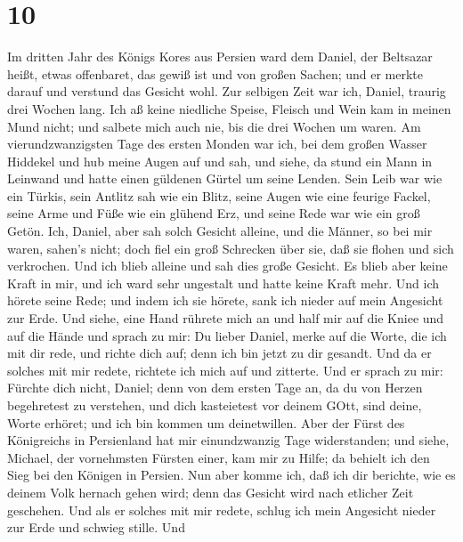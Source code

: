 \hypertarget{section-9}{%
\section{10}\label{section-9}}

 Im dritten Jahr des Königs Kores aus Persien ward dem
Daniel, der Beltsazar heißt, etwas offenbaret, das gewiß ist und von
großen Sachen; und er merkte darauf und verstund das Gesicht wohl.
 Zur selbigen Zeit war ich, Daniel, traurig drei Wochen
lang.  Ich aß keine niedliche Speise, Fleisch und Wein kam
in meinen Mund nicht; und salbete mich auch nie, bis die drei Wochen um
waren.  Am vierundzwanzigsten Tage des ersten Monden war
ich, bei dem großen Wasser Hiddekel  und hub meine Augen auf
und sah, und siehe, da stund ein Mann in Leinwand und hatte einen
güldenen Gürtel um seine Lenden.  Sein Leib war wie ein
Türkis, sein Antlitz sah wie ein Blitz, seine Augen wie eine feurige
Fackel, seine Arme und Füße wie ein glühend Erz, und seine Rede war wie
ein groß Getön.  Ich, Daniel, aber sah solch Gesicht
alleine, und die Männer, so bei mir waren, sahen's nicht; doch fiel ein
groß Schrecken über sie, daß sie flohen und sich verkrochen.
 Und ich blieb alleine und sah dies große Gesicht. Es blieb
aber keine Kraft in mir, und ich ward sehr ungestalt und hatte keine
Kraft mehr.  Und ich hörete seine Rede; und indem ich sie
hörete, sank ich nieder auf mein Angesicht zur Erde.  Und
siehe, eine Hand rührete mich an und half mir auf die Kniee und auf die
Hände  und sprach zu mir: Du lieber Daniel, merke auf die
Worte, die ich mit dir rede, und richte dich auf; denn ich bin jetzt zu
dir gesandt. Und da er solches mit mir redete, richtete ich mich auf und
zitterte.  Und er sprach zu mir: Fürchte dich nicht,
Daniel; denn von dem ersten Tage an, da du von Herzen begehretest zu
verstehen, und dich kasteietest vor deinem GOtt, sind deine, Worte
erhöret; und ich bin kommen um deinetwillen.  Aber der
Fürst des Königreichs in Persienland hat mir einundzwanzig Tage
widerstanden; und siehe, Michael, der vornehmsten Fürsten einer, kam mir
zu Hilfe; da behielt ich den Sieg bei den Königen in Persien.
 Nun aber komme ich, daß ich dir berichte, wie es deinem
Volk hernach gehen wird; denn das Gesicht wird nach etlicher Zeit
geschehen.  Und als er solches mit mir redete, schlug ich
mein Angesicht nieder zur Erde und schwieg stille.  Und
